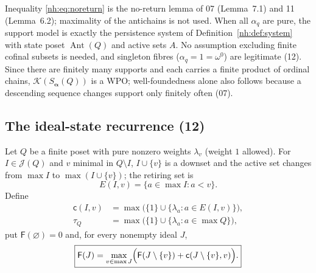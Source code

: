 \documentclass[11pt,a4paper]{article}
\theoremstyle{definition}
\theoremstyle{remark}
\newcommand{\K}{\mathcal K}
\newcommand{\J}{\mathcal J}
\newcommand{\Ant}{\operatorname{Ant}}
\newcommand{\Fdp}{\mathsf F}
\begin{document}
Inequality \eqref{nh:eq:noreturn} is the no-return lemma of 07
(Lemma~7.1) and 11 (Lemma~6.2); maximality of the antichains is not used. When
all $\alpha_q$ are pure, the support model is exactly the persistence system of
Definition~\ref{nh:def:system} with state poset $\Ant(Q)$ and active sets $A$.
No assumption excluding finite cofinal subsets is needed, and singleton
fibres ($\alpha_q=1=\omega^0$) are legitimate (12). Since there are finitely
many supports and each carries a finite product of ordinal chains,
$\K(S_{\boldsymbol\alpha}(Q))$ is a WPO; well-foundedness alone also follows
because a descending sequence changes support only finitely often (07).

\subsection{The ideal-state recurrence (12)}

Let $Q$ be a finite poset with pure nonzero weights $\lambda_v$ (weight $1$
allowed). For $I\in\J(Q)$ and $v$ minimal in $Q\setminus I$, $I\cup\{v\}$ is a
downset and the active set changes from $\max I$ to $\max(I\cup\{v\})$; the
retiring set is
\begin{equation}\label{nh:eq:retiredideal}
 E(I,v)=\{a\in\max I:a<v\}.
\end{equation}
Define
\begin{align}
 \mathsf c(I,v)&=\max\bigl(\{1\}\cup\{\lambda_a:a\in E(I,v)\}\bigr),
   \label{nh:eq:edgecost}\\
 \tau_Q&=\max\bigl(\{1\}\cup\{\lambda_a:a\in\max Q\}\bigr),
   \label{nh:eq:terminal}
\end{align}
put $\Fdp(\varnothing)=0$ and, for every nonempty ideal $J$,
\begin{equation}\label{nh:eq:dp}
 \boxed{\displaystyle
 \Fdp(J)=\max_{v\in\max J}
 \Bigl(\Fdp(J\setminus\{v\})+\mathsf c(J\setminus\{v\},v)\Bigr).}
\end{equation}
\end{document}
